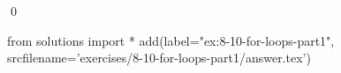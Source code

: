 
\begin{ex}
  \label{ex:8-10-for-loops-part1}
  
  \qed
\end{ex}
\begin{python0}
from solutions import *
add(label="ex:8-10-for-loops-part1",
    srcfilename='exercises/8-10-for-loops-part1/answer.tex')
\end{python0}
